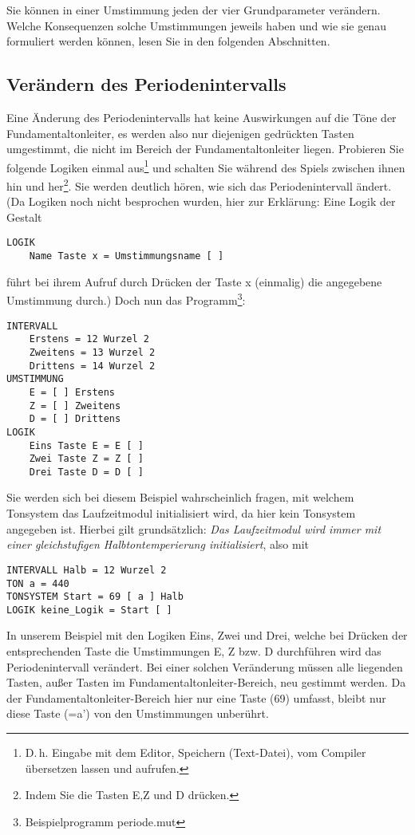 Sie können in einer Umstimmung jeden der vier Grundparameter
ver\-än\-dern. Welche Konsequenzen solche Umstimmungen jeweils haben
und wie sie genau formuliert werden können, lesen Sie in den folgenden
Abschnitten.

\subsection{Verändern des Periodenintervalls}\label{sec:verand-des-peri}
 Eine Änderung des
Periodenintervalls hat keine Auswirkungen auf die Töne der Fundamentaltonleiter, es
werden also nur diejenigen gedrückten Tasten umgestimmt, die nicht im
Bereich der Fundamentaltonleiter liegen.  Probieren Sie folgende Logiken einmal
aus\footnote{D.\,h. Eingabe mit dem Editor, Speichern (Text-Datei), vom
  Compiler übersetzen lassen und aufrufen.} und schalten Sie während
des Spiels zwischen ihnen hin und her\footnote{Indem Sie die Tasten
  E,Z und D drücken.}. Sie werden deutlich hören, wie sich das
Periodenintervall ändert.  (Da Logiken noch nicht besprochen wurden,
hier zur Erklärung: Eine Logik der Gestalt
\begin{verbatim}
LOGIK
    Name Taste x = Umstimmungsname [ ]
\end{verbatim}
führt bei ihrem Aufruf durch Drücken der Taste x (einmalig) die
angegebene Umstimmung durch.)
Doch nun das Programm\footnote{Beispielprogramm periode.mut}:
\label{PERIODE}
\begin{verbatim}
INTERVALL
    Erstens = 12 Wurzel 2
    Zweitens = 13 Wurzel 2
    Drittens = 14 Wurzel 2
UMSTIMMUNG
    E = [ ] Erstens
    Z = [ ] Zweitens
    D = [ ] Drittens
LOGIK
    Eins Taste E = E [ ]
    Zwei Taste Z = Z [ ]
    Drei Taste D = D [ ]
\end{verbatim}
Sie werden sich bei diesem Beispiel wahrscheinlich fragen, mit
welchem Tonsystem das Laufzeitmodul initialisiert wird, da hier
kein Tonsystem angegeben ist. Hierbei gilt grundsätzlich: \emph{Das
Laufzeitmodul wird immer mit einer gleichstufigen
Halbtontemperierung initialisiert}, also mit
\begin{verbatim}
INTERVALL Halb = 12 Wurzel 2
TON a = 440
TONSYSTEM Start = 69 [ a ] Halb
LOGIK keine_Logik = Start [ ]
\end{verbatim}
In unserem Beispiel mit den Logiken Eins, Zwei und Drei, welche
bei Drücken der entsprechenden Taste die Umstimmungen E, Z bzw. D
durchführen wird das Periodenintervall verändert. Bei einer solchen
Veränderung müssen
alle liegenden Tasten, außer Tasten im Fundamentaltonleiter-Bereich, neu gestimmt
werden. Da der Fundamentaltonleiter-Bereich hier nur eine Taste (69) umfasst, bleibt
nur diese Taste (=a') von den Umstimmungen unberührt.


